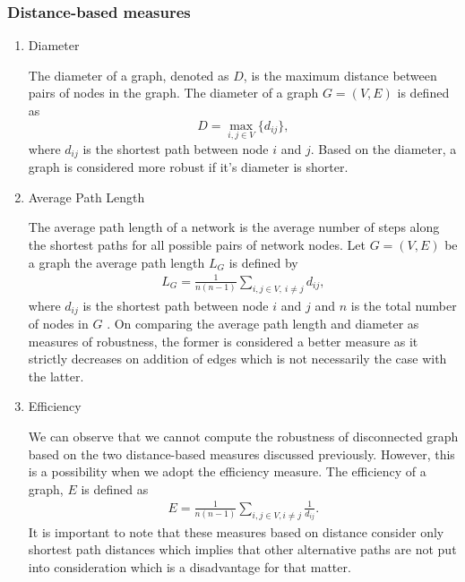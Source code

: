 \documentclass[10pt,a4paper]{article}
\theoremstyle{plain}
\theoremstyle{definition}
\begin{document}
	\subsubsection{Distance-based measures}
	\begin{enumerate}
		\item Diameter
	
		The diameter of a graph, denoted as $D$, is the maximum distance between pairs of nodes in the graph\citep{wang2003complex}. The diameter of a graph $G= (V,E )$ is defined as \[ D = \max_{i,j \in V} \{d_{ij}\},\] where $d_{ij}$ is the shortest path between node $i$ and $j$. Based on the diameter, a graph is considered more robust if it's diameter is shorter.
		\item Average Path Length
		
		The average path length of a network is the average number of steps along the shortest paths for all possible pairs of network nodes. Let $G = (V , E )$ be a graph the average path length $L_G$ is defined by
		\begin{eqnarray}
		L_G = \frac{1}{n(n-1)} \sum_{i,j \in V,~i \neq j} d_{ij},
		\end{eqnarray}
		where $d_{ij}$ is the shortest path between node $i$ and $j$ and $n$ is the total number of nodes in $G$ \citep{wang2003complex}. 
		On comparing the average path length and diameter as measures of robustness, the former is considered a better measure as it strictly decreases on addition of edges which is not necessarily the case with the latter.
		\item Efficiency
		
		We can observe that we cannot compute the robustness of disconnected graph based on the two distance-based measures discussed previously. However, this is a possibility when we adopt the efficiency measure. 
		The efficiency of a graph, $E$ is defined as
		\begin{eqnarray}
			E =\frac{1}{n(n-1)} \sum_{i,j \in V,i\neq j} \frac{1}{d_{ij}}.
			\label{eqn:eff}
		\end{eqnarray}
		It is important to note that these measures based on distance consider only shortest path distances which implies that other alternative paths are not put into consideration which is a disadvantage for that matter.
	\end{enumerate}
	
	
\end{document}
